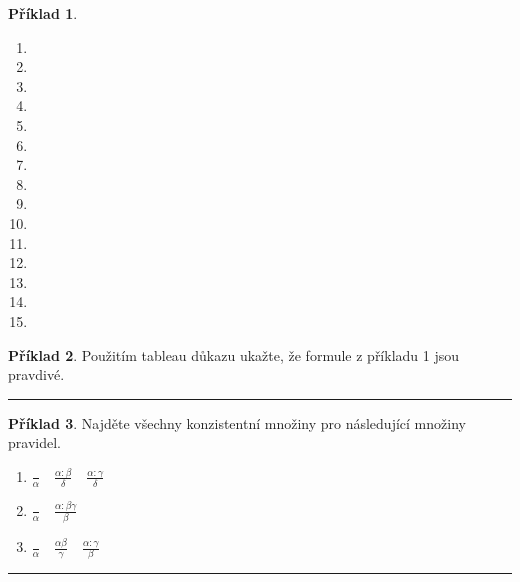\documentclass[a4paper]{article}
\theoremstyle{definition}
\newtheorem{priklad}{Příklad}
\begin{document}
\begin{priklad}
\begin{enumerate}
      \item
            
        
      \item
      
      \item
        
      \item
        
      \item 
        
      \item
        
      \item
        
      \item
      \item 
      \item
      \item
      \item
      \item 
      \item
      \item
    \end{enumerate}
\end{priklad}

\begin{priklad}
    Použitím tableau důkazu ukažte, že formule z příkladu 1 jsou pravdivé.
    
\noindent\rule{\linewidth}{.2pt}    
\end{priklad}

\begin{priklad}
    Najděte všechny konzistentní množiny pro následující množiny pravidel.
    
    \begin{enumerate}
      \item $\displaystyle \frac{}{\alpha} \quad \frac{\alpha:\beta}{\delta} \quad \frac{\alpha:\gamma}{\delta}$
      \item $\displaystyle \frac{}{\alpha} \quad \frac{\alpha:\beta\gamma}{\beta}$
      \item $\displaystyle \frac{}{\alpha} \quad \frac{\alpha\beta}{\gamma} \quad \frac{\alpha:\gamma}{\beta}$
    \end{enumerate}
    
\noindent\rule{\linewidth}{.2pt}    
\end{priklad}
\end{document}
